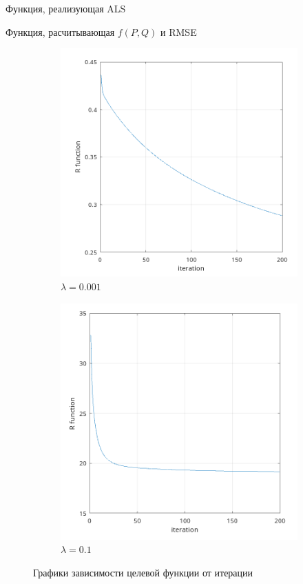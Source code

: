 \documentclass{article}
\begin{document}
    Функция, реализующая ALS
    
    \bigbreak
     
    Функция, расчитывающая $f(P, Q)$ и RMSE
         
    
    \begin{figure}[h!]
        \centering
        \begin{subfigure}[b]{0.4\linewidth}
            \includegraphics[width=\linewidth]{Plots/R_fun_0_001.png}
            \caption{$\lambda = 0.001$}
        \end{subfigure}
        \begin{subfigure}[b]{0.4\linewidth}
            \includegraphics[width=\linewidth]{Plots/R_fun_0_1.png}
            \caption{$\lambda = 0.1$}
        \end{subfigure}
        \caption{Графики зависимости целевой функции от итерации}
    \end{figure}
\end{document}
